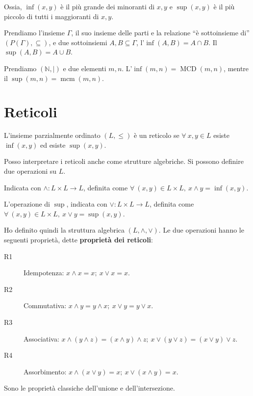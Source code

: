 Ossia, $\inf(x,y)$ \`e il pi\`u grande dei minoranti di $x,y$ e $\sup(x,y)$ \`e il pi\`u piccolo di tutti i maggioranti di $x, y$.

Prendiamo l'insieme $\Gamma$, il suo insieme delle parti e la relazione ``\`e sottoinsieme di'' $(P(\Gamma),\subseteq)$, e due sottoinsiemi $A, B \subseteq \Gamma$, l'$\inf(A,B) = A \cap B$. Il $\sup(A,B) = A \cup B$.

Prendiamo $(\mathbb{N},|)$ e due elementi $m, n$. L'$\inf(m,n) = \operatorname{MCD}(m,n)$, mentre il $\sup(m,n) = \operatorname{mcm}(m,n)$.

\section{Reticoli}
\begin{defn}
L'insieme parzialmente ordinato $(L, \leq)$ \`e un reticolo se $\forall \ x, y \in L $ esiste $\inf(x,y)$ ed esiste $\sup(x,y)$.
\end{defn}

Posso interpretare i reticoli anche come strutture algebriche. Si possono definire due operazioni su $L$. 

\begin{defn}
Indicata con $\wedge: L \times L \to L$, definita come $ \forall \ (x,y) \in L \times L , \ x \wedge y = \inf(x,y) $.
\end{defn}
\begin{defn}
L'operazione di $\sup $, indicata con $ \vee: L \times L \to L$, definita come $\forall \ (x,y) \in L \times L , \ x \vee y = \sup(x,y)$.
\end{defn}

Ho definito quindi la struttura algebrica $(L, \wedge, \vee)$. Le due operazioni hanno le seguenti propriet\`a, dette \label{proprieta_dei_reticoli} \textbf{propriet\`a dei reticoli}:
\begin{description}
    \item[R1\label{itm:r1}] Idempotenza: $x \wedge x = x ; \ x \vee x = x$.
    \item [R2\label{itm:r2}] Commutativa: $x \wedge y = y \wedge x ; \ x \vee y = y \vee x$.
    \item [R3\label{itm:r3}] Associativa: $x \wedge ( y \wedge z) = (x \wedge y) \wedge z; \ x \vee ( y \vee z) = (x \vee y) \vee z$.
    \item [R4\label{itm:r4}] Assorbimento: $x \wedge (x \vee y) = x ; \ x \vee ( x \wedge y) = x$.
\end{description}
Sono le propriet\`a classiche dell'unione e dell'intersezione.

